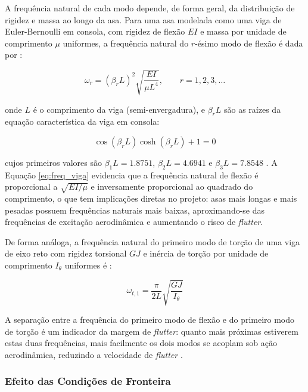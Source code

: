 \documentclass[a4paper,fleqn]{cas-sc}
\begin{document}
A frequência natural de cada modo depende, de forma geral, da distribuição de rigidez e massa ao longo da asa. Para uma asa modelada como uma viga de Euler-Bernoulli em consola, com rigidez de flexão $EI$ e massa por unidade de comprimento $\mu$ uniformes, a frequência natural do $r$-ésimo modo de flexão é dada por \cite{Rao2011}:

\begin{equation}
    \omega_r = \left(\beta_r L\right)^2 \sqrt{\frac{EI}{\mu L^4}}, 
    \qquad r = 1, 2, 3, \ldots
    \label{eq:freq_viga}
\end{equation}

\noindent onde $L$ é o comprimento da viga (semi-envergadura), e $\beta_r L$ são as raízes da equação característica da viga em consola:

\begin{equation}
    \cos(\beta_r L)\cosh(\beta_r L) + 1 = 0
    \label{eq:char_cantilever}
\end{equation}

cujos primeiros valores são $\beta_1 L = 1.8751$, $\beta_2 L = 4.6941$ e $\beta_3 L = 7.8548$ \cite{Rao2011}. A Equação \eqref{eq:freq_viga} evidencia que a frequência natural de flexão é proporcional a $\sqrt{EI/\mu}$ e inversamente proporcional ao quadrado do comprimento, o que tem implicações diretas no projeto: asas mais longas e mais pesadas possuem frequências naturais mais baixas, aproximando-se das frequências de excitação aerodinâmica e aumentando o risco de \textit{flutter}.

De forma análoga, a frequência natural do primeiro modo de torção de uma viga de eixo reto com rigidez torsional $GJ$ e inércia de torção por unidade de comprimento $I_\theta$ uniformes é \cite{Bisplinghoff1996}:

\begin{equation}
    \omega_{t,1} = \frac{\pi}{2L}\sqrt{\frac{GJ}{I_\theta}}
    \label{eq:freq_torcao}
\end{equation}

A separação entre a frequência do primeiro modo de flexão e do primeiro modo de torção é um indicador da margem de \textit{flutter}: quanto mais próximas estiverem estas duas frequências, mais facilmente os dois modos se acoplam sob ação aerodinâmica, reduzindo a velocidade de \textit{flutter} \cite{Fung1993, Dowell2004}.

\subsubsection{Efeito das Condições de Fronteira}
\end{document}
